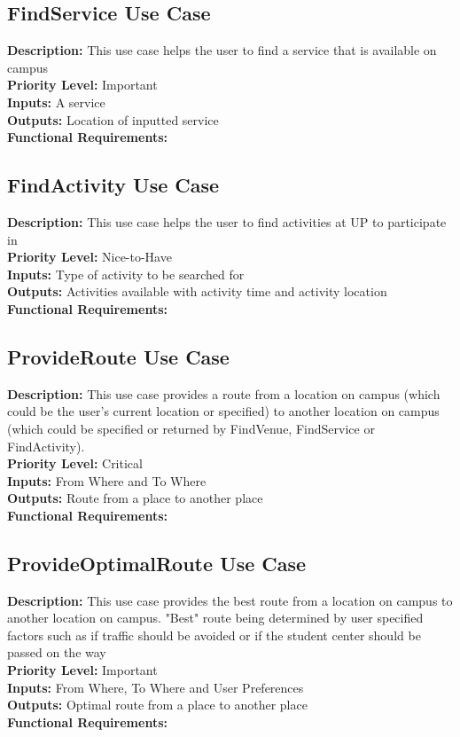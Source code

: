 \documentclass[a4paper,12pt]{article}
\begin{document}
\subsection{FindService Use Case}
\textbf{Description: } This use case helps the user to find a service that is available on campus\\
\textbf{Priority Level:} Important\\
\textbf{Inputs:} A service\\
\textbf{Outputs:} Location of inputted service\\
\textbf{Functional Requirements: }\\

\subsection{FindActivity Use Case}
\textbf{Description: } This use case helps the user to find activities at UP to participate in\\
\textbf{Priority Level: } Nice-to-Have\\
\textbf{Inputs:} Type of activity to be searched for\\
\textbf{Outputs:} Activities available with activity time and activity location\\
\textbf{Functional Requirements: }\\

\subsection{ProvideRoute Use Case}
\textbf{Description: } This use case provides a route from a location on campus (which could be the user's current location or specified) to another location on campus (which could be specified or returned by FindVenue, FindService or FindActivity).\\
\textbf{Priority Level: } Critical\\
\textbf{Inputs:} From Where and To Where\\
\textbf{Outputs:} Route from a place to another place\\
\textbf{Functional Requirements: }\\

\subsection{ProvideOptimalRoute Use Case}
\textbf{Description: } This use case provides the best route from a location on campus to another location on campus. "Best" route being determined by user specified factors such as if traffic should be avoided or if the student center should be passed on the way\\
\textbf{Priority Level: } Important\\
\textbf{Inputs:} From Where, To Where and User Preferences\\
\textbf{Outputs:} Optimal route from a place to another place\\
\textbf{Functional Requirements: }\\
\end{document}
